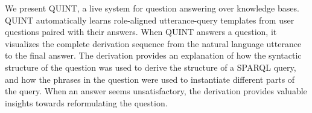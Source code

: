 We present QUINT, a live system for question answering over knowledge bases. QUINT automatically learns role-aligned utterance-query templates from user questions paired with their answers. When QUINT answers a question, it visualizes the complete derivation sequence from the natural language utterance to the final answer. The derivation provides an explanation of how the syntactic structure of the question was used to derive the structure of a SPARQL query, and how the phrases in the question were used to instantiate different parts of the query. When an answer seems unsatisfactory, the derivation provides valuable insights towards reformulating the question.
